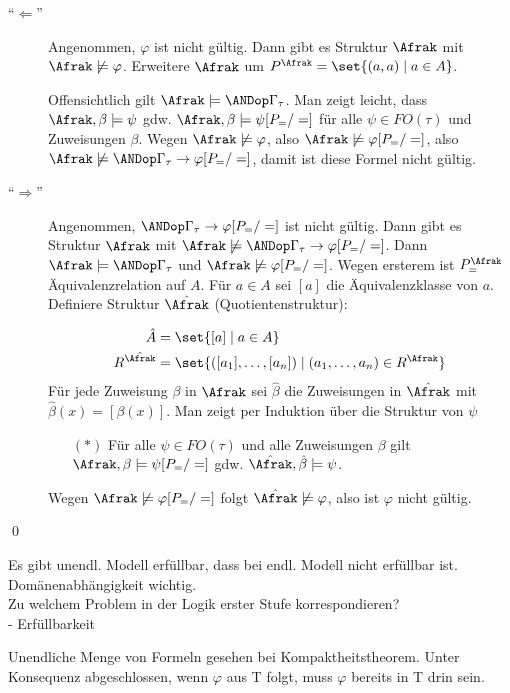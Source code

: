 \begin{description}
  \item[\enquote{$\Leftarrow$}]
  Angenommen, $\varphi$ ist nicht gültig. Dann gibt es Struktur $\Afrak$
  mit $\Afrak\not\models\varphi$. Erweitere $\Afrak$ um $P^\Afrak =
  \set{(a,a)\mid a\in A}$.
  
  Offensichtlich gilt $\Afrak\models\ANDop\Gamma_\tau$. Man zeigt leicht,
  dass $\Afrak,\beta\models\psi$ gdw. $\Afrak,\beta\models\psi[P_=/=]$ für
  alle $\psi\in FO(\tau)$ und Zuweisungen $\beta$. Wegen
  $\Afrak\not\models\varphi$, also $\Afrak\not\models\varphi[P_=/=]$, also
  $\Afrak\not\models\ANDop\Gamma_\tau \rightarrow \varphi[P_=/=]$, damit
  ist diese Formel nicht gültig.
  
  \item[\enquote{$\Rightarrow$}]
  Angenommen, $\ANDop\Gamma_\tau \rightarrow \varphi[P_=/=]$ ist nicht
  gültig. Dann gibt es Struktur $\Afrak$ mit $\Afrak\not\models\ANDop
  \Gamma_\tau\rightarrow\varphi[P_=/=]$. Dann $\Afrak\models\ANDop
  \Gamma_\tau$ und $\Afrak\not\models\varphi[P_=/=]$. Wegen ersterem ist
  $P_=^\Afrak$ Äquivalenzrelation auf $A$. Für $a\in A$ sei $[a]$ die
  Äquivalenzklasse von $a$. Definiere Struktur $\hat{\Afrak}$
  (Quotientenstruktur):
  
  \begin{align*}
    \hat{A} &= \set{[a] \mid a\in A}\\
    R^{\hat{\Afrak}} &= \set{([a_1],\dots,[a_n]) \mid (a_1,\dots,a_n) \in R^\Afrak }\\
  \end{align*}
  Für jede Zuweisung $\beta$ in $\Afrak$ sei $\hat{\beta}$ die
  Zuweisungen in $\hat{\Afrak}$ mit $\hat{\beta}(x)=[\beta(x)]$. Man
  zeigt per Induktion über die Struktur von $\psi$
  
  \begin{itemize}
    \item[$(*)$] Für alle $\psi\in FO(\tau)$ und alle Zuweisungen $\beta$
    gilt $\Afrak,\beta\models\psi[P_=/=]$ gdw. $\hat{\Afrak},\hat{\beta}\models\psi$.
  \end{itemize}
  
  Wegen $\Afrak\not\models\varphi[P_=/=]$ folgt $\hat{\Afrak}\not\models\varphi$, also ist $\varphi$ nicht gültig.
\end{description}
\qed

Es gibt unendl. Modell erfüllbar, dass bei endl. Modell nicht erfüllbar ist.\\
Domänenabhängigkeit wichtig.\\
Zu welchem Problem in der Logik erster Stufe korrespondieren?\\
- Erfüllbarkeit

Unendliche Menge von Formeln gesehen bei Kompaktheitstheorem. Unter Konsequenz abgeschlossen,
wenn $\varphi$ aus T folgt, muss $\varphi$ bereits in T drin sein.

